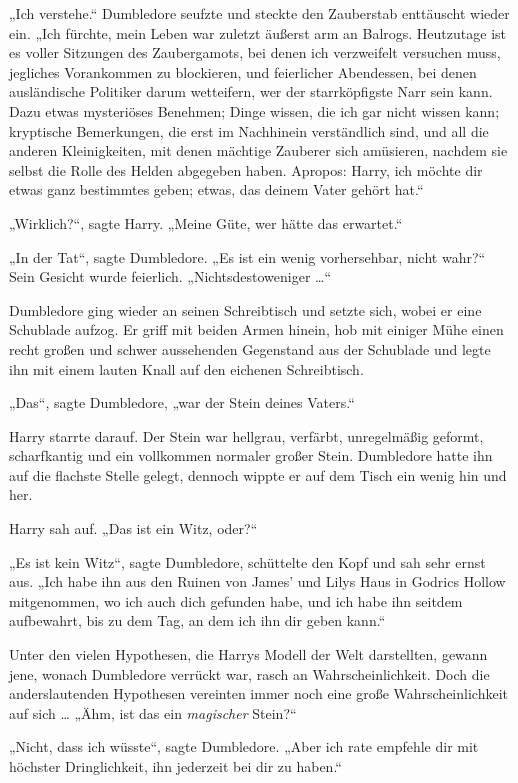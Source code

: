 {„Ich verstehe.“ Dumbledore seufzte und steckte den Zauberstab enttäuscht wieder ein. „Ich fürchte, mein Leben war zuletzt äußerst arm an Balrogs. Heutzutage ist es voller Sitzungen des Zaubergamots, bei denen ich verzweifelt versuchen muss, jegliches Vorankommen zu blockieren, und feierlicher Abendessen, bei denen ausländische Politiker darum wetteifern, wer der starrköpfigste Narr sein kann. Dazu etwas mysteriöses Benehmen; Dinge wissen, die ich gar nicht wissen kann; kryptische Bemerkungen, die erst im Nachhinein verständlich sind, und all die anderen Kleinigkeiten, mit denen mächtige Zauberer sich amüsieren, nachdem sie selbst die Rolle des Helden abgegeben haben. Apropos: Harry, ich möchte dir etwas ganz bestimmtes geben; etwas, das deinem Vater gehört hat.“

„Wirklich?“, sagte Harry. „Meine Güte, wer hätte das erwartet.“

„In der Tat“, sagte Dumbledore. „Es ist ein wenig vorhersehbar, nicht wahr?“ Sein Gesicht wurde feierlich. „Nichtsdestoweniger …“

Dumbledore ging wieder an seinen Schreibtisch und setzte sich, wobei er eine Schublade aufzog. Er griff mit beiden Armen hinein, hob mit einiger Mühe einen recht großen und schwer aussehenden Gegenstand aus der Schublade und legte ihn mit einem lauten Knall auf den eichenen Schreibtisch.

„Das“, sagte Dumbledore, „war der Stein deines Vaters.“

Harry starrte darauf. Der Stein war hellgrau, verfärbt, unregelmäßig geformt, scharfkantig und ein vollkommen normaler großer Stein. Dumbledore hatte ihn auf die flachste Stelle gelegt, dennoch wippte er auf dem Tisch ein wenig hin und her.

Harry sah auf. „Das ist ein Witz, oder?“

„Es ist kein Witz“, sagte Dumbledore, schüttelte den Kopf und sah sehr ernst aus. „Ich habe ihn aus den Ruinen von James' und Lilys Haus in Godrics Hollow mitgenommen, wo ich auch dich gefunden habe, und ich habe ihn seitdem aufbewahrt, bis zu dem Tag, an dem ich ihn dir geben kann.“

Unter den vielen Hypothesen, die Harrys Modell der Welt darstellten, gewann jene, wonach Dumbledore verrückt war, rasch an Wahrscheinlichkeit. Doch die anderslautenden Hypothesen vereinten immer noch eine große Wahrscheinlichkeit auf sich … „Ähm, ist das ein \emph{magischer} Stein?“

„Nicht, dass ich wüsste“, sagte Dumbledore. „Aber ich rate empfehle dir mit höchster Dringlichkeit, ihn jederzeit bei dir zu haben.“

}
